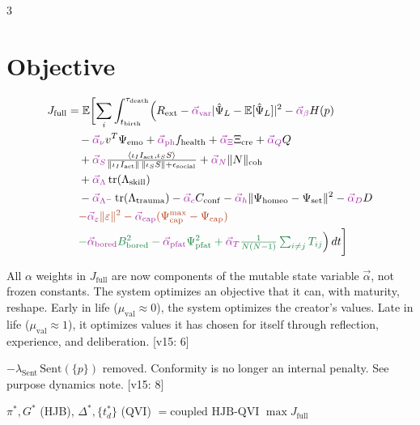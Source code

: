 \documentclass[8pt,landscape]{extarticle}
\newcommand{\vnew}[1]{\textcolor{v13color}{#1}}
\newcommand{\vfour}[1]{\textcolor{v14color}{#1}}
\newcommand{\vfive}[1]{\textcolor{v15color}{#1}}
\newcommand{\vfivelabel}[1]{\textcolor{v15color}{\textsf{\scriptsize[v15: #1]}}}
\begin{document}
\begin{multicols}{3}
\section*{Objective}
\begin{align*}
J_{\mathrm{full}} &= \mathbb{E}\biggl[\sum_i \int_{t_{\mathrm{birth}}}^{\tau_{\mathrm{death}}}\Bigl(R_{\mathrm{ext}} - \vfive{\vec\alpha_{\mathrm{var}}}|\hat\Psi_L - \mathbb{E}[\hat\Psi_L]|^2 - \vfive{\vec\alpha_\beta} H(p) \\
&\quad - \vfive{\vec\alpha_\nu} v^T\Psi_{\mathrm{emo}} + \vfive{\vec\alpha_{\mathrm{ph}}}f_{\mathrm{health}} + \vfive{\vec\alpha_\Xi}\Xi_{\mathrm{cre}} + \vfive{\vec\alpha_Q} Q \\
&\quad + \vfive{\vec\alpha_S}\tfrac{\langle\iota_I I_{\mathrm{act}}, \iota_S S\rangle}{\|\iota_I I_{\mathrm{act}}\|\,\|\iota_S S\| + \epsilon_{\mathrm{social}}} + \vfive{\vec\alpha_N}\|N\|_{\mathrm{coh}} \\
&\quad + \vfive{\vec\alpha_\Lambda}\operatorname{tr}(\Lambda_{\mathrm{skill}}) \\
&\quad - \vfive{\vec\alpha_{\Lambda^-}}\operatorname{tr}(\Lambda_{\mathrm{trauma}}) - \vfive{\vec\alpha_c} C_{\mathrm{conf}} - \vfive{\vec\alpha_h}\|\Psi_{\mathrm{homeo}} - \Psi_{\mathrm{set}}\|^2 - \vfive{\vec\alpha_D} D \\
&\quad \vnew{- \vfive{\vec\alpha_\varepsilon}\|\varepsilon\|^2 - \vfive{\vec\alpha_{\mathrm{cap}}}(\Psi^{\max}_{\mathrm{cap}} - \Psi_{\mathrm{cap}})} \\
&\quad \vfour{- \vfive{\vec\alpha_{\mathrm{bored}}} B_{\mathrm{bored}}^2 - \vfive{\vec\alpha_{\mathrm{pfat}}}\Psi_{\mathrm{pfat}}^2 + \vfive{\vec\alpha_T}\tfrac{1}{N(N{-}1)}\textstyle\sum_{i\ne j}T_{ij}}\Bigr)\,dt\biggr]
\end{align*}

\vfive{All $\alpha$ weights in $J_{\mathrm{full}}$ are now components of the mutable state variable $\vec\alpha$, not frozen constants. The system optimizes an objective that it can, with maturity, reshape. Early in life ($\mu_{\mathrm{val}} \approx 0$), the system optimizes the creator's values. Late in life ($\mu_{\mathrm{val}} \approx 1$), it optimizes values it has chosen for itself through reflection, experience, and deliberation.} \vfivelabel{6}

\vfive{$-\lambda_{\mathrm{Sent}}\,\mathrm{Sent}(\{p\})$ removed. Conformity is no longer an internal penalty. See purpose dynamics note.} \vfivelabel{8}

$\pi^*, G^*$ (HJB), $\Delta^*, \{t^*_d\}$ (QVI) $= \text{coupled HJB-QVI } \max J_{\mathrm{full}}$


\end{multicols}
\end{document}
